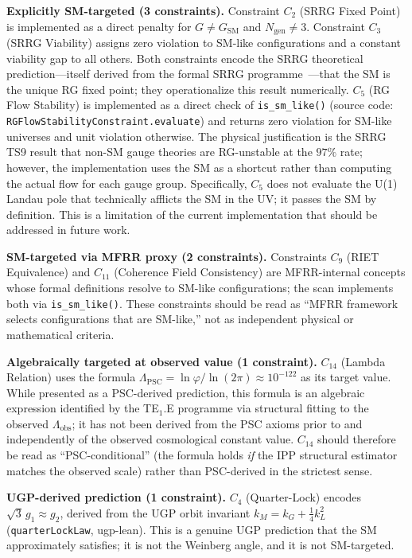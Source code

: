 \documentclass[11pt,twocolumn]{article}
\theoremstyle{remark}
\begin{document}
\textbf{Explicitly SM-targeted (3 constraints).}
Constraint $C_2$ (SRRG Fixed Point) is implemented as a direct
penalty for $G\neq G_{\mathrm{SM}}$ and $N_{\mathrm{gen}}\neq 3$.
Constraint $C_3$ (SRRG Viability) assigns zero violation to SM-like
configurations and a constant viability gap to all others.
Both constraints encode the SRRG theoretical prediction---itself
derived from the formal SRRG programme~\cite{SpivackPSCOpt}---that
the SM is the unique RG fixed point; they operationalize this result
numerically. $C_5$ (RG Flow Stability) is implemented as a direct
check of \texttt{is\_sm\_like()} (source code: \texttt{RGFlowStabilityConstraint.evaluate})
and returns zero violation for SM-like universes and unit violation
otherwise. The physical justification is the SRRG TS9 result that
non-SM gauge theories are RG-unstable at the $97\%$ rate; however, the
implementation uses the SM as a shortcut rather than computing the
actual flow for each gauge group. Specifically, $C_5$ does not
evaluate the U(1) Landau pole that technically afflicts the SM in the
UV; it passes the SM by definition. This is a limitation of the
current implementation that should be addressed in future work.

\textbf{SM-targeted via MFRR proxy (2 constraints).}
Constraints $C_9$ (RIET Equivalence) and $C_{11}$ (Coherence Field
Consistency) are MFRR-internal concepts whose formal definitions
resolve to SM-like configurations; the scan implements both via
\texttt{is\_sm\_like()}. These constraints should be read as
``MFRR framework selects configurations that are SM-like,'' not as
independent physical or mathematical criteria.

\textbf{Algebraically targeted at observed value (1 constraint).}
$C_{14}$ (Lambda Relation) uses the formula
$\Lambda_{\mathrm{PSC}}=\ln\varphi/\ln(2\pi)\approx 10^{-122}$
as its target value. While presented as a PSC-derived prediction,
this formula is an algebraic expression identified by the TE$_1$.E
programme via structural fitting to the observed $\Lambda_{\mathrm{obs}}$;
it has not been derived from the PSC axioms prior to and independently of
the observed cosmological constant value. $C_{14}$ should therefore be
read as ``PSC-conditional'' (the formula holds \emph{if} the IPP
structural estimator matches the observed scale) rather than PSC-derived
in the strictest sense.

\textbf{UGP-derived prediction (1 constraint).}
$C_4$ (Quarter-Lock) encodes $\sqrt{3}\,g_1\approx g_2$, derived from
the UGP orbit invariant $k_M=k_G+\tfrac{1}{4}k_L^2$
(\texttt{quarterLockLaw}, ugp-lean). This is a genuine UGP prediction
that the SM approximately satisfies; it is not the Weinberg angle, and
it is not SM-targeted.
\end{document}
